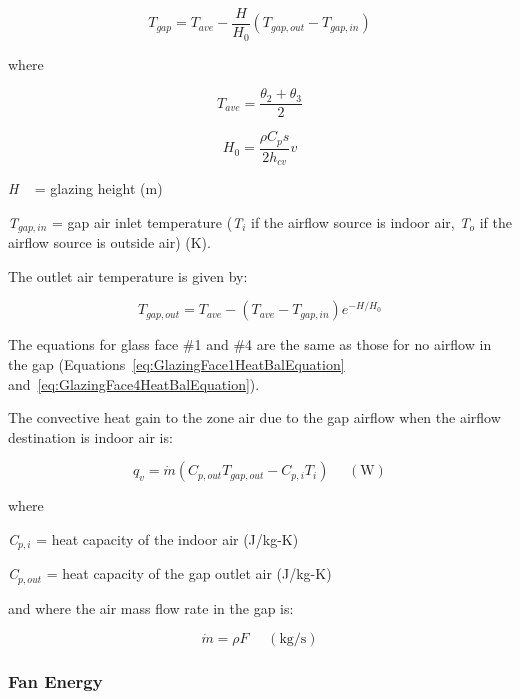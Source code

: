 \begin{equation}
{T_{gap}} = {T_{ave}} - \frac{H}{{{H_0}}}({T_{gap,out}} - {T_{gap,in}})
\end{equation}

where

\begin{equation}
{T_{ave}} = \frac{{{\theta_2} + {\theta_3}}}{2}
\end{equation}

\begin{equation}
{H_0} = \frac{{\rho {C_p}s}}{{2{h_{cv}}}}v
\end{equation}

\emph{H} ~ = glazing height (m)

\emph{T\(_{gap,in}\)} = gap air inlet temperature (\emph{T\(_{i}\)} if the airflow source is indoor air, \emph{T\(_{o}\)} if the airflow source is outside air) (K).

The outlet air temperature is given by:

\begin{equation}
{T_{gap,out}} = {T_{ave}} - ({T_{ave}} - {T_{gap,in}}){e^{ - H/{H_0}}}
\end{equation}

The equations for glass face \#1 and \#4 are the same as those for no airflow in the gap (Equations~\ref{eq:GlazingFace1HeatBalEquation} and~\ref{eq:GlazingFace4HeatBalEquation}).

The convective heat gain to the zone air due to the gap airflow when the airflow destination is indoor air is:

\begin{equation}
{q_v} = \dot m({C_{p,out}}{T_{gap,out}} - {C_{p,i}}{T_i}){\mathrm{~~~~~~(W)}}
\end{equation}

where

\emph{C\(_{p,i}\)} = heat capacity of the indoor air (J/kg-K)

\emph{C\(_{p,out}\)} = heat capacity of the gap outlet air (J/kg-K)

and where the air mass flow rate in the gap is:

\begin{equation}
\dot m = \rho F{\mathrm{~~~~~~(kg/s)}}
\end{equation}

\subsubsection{Fan Energy}\label{fan-energy}

